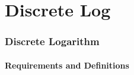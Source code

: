 \section{Discrete Log}
\begin{frame}
	\frametitle{Discrete Logarithm}
	\framesubtitle{Requirements and Definitions}
\end{frame}